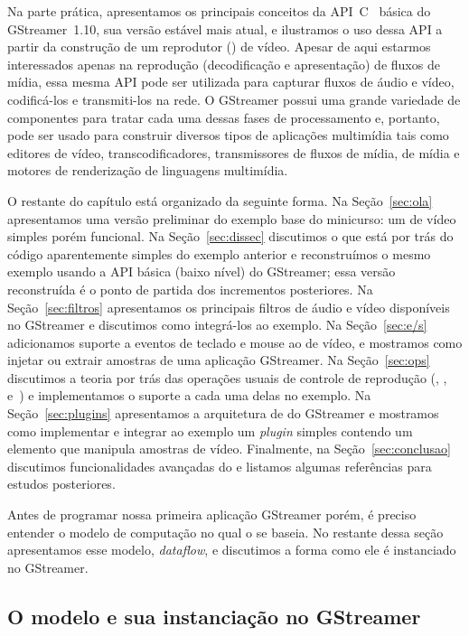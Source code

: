 \documentclass{SBCbookchapter}
\begin{document}
Na parte prática, apresentamos os principais conceitos da
API~C~\cite{Kernighan-B-W-1988} básica do GStreamer~1.10, sua versão estável
mais atual, e ilustramos o uso dessa API a partir da construção de um
reprodutor () de vídeo.  Apesar de aqui estarmos interessados
apenas na reprodução (decodificação e apresentação) de fluxos de mídia, essa
mesma API pode ser utilizada para capturar fluxos de áudio e vídeo,
codificá-los e transmiti-los na rede.  O GStreamer possui uma grande
variedade de componentes para tratar cada uma dessas fases de processamento
e, portanto, pode ser usado para construir diversos tipos de aplicações
multimídia tais como editores de vídeo, transcodificadores, transmissores de
fluxos de mídia,  de mídia e motores de renderização de
linguagens multimídia.

O restante do capítulo está organizado da seguinte forma.  Na
Seção~\ref{sec:ola} apresentamos uma versão preliminar do exemplo base do
minicurso: um  de vídeo simples porém funcional.  Na
Seção~\ref{sec:dissec} discutimos o que está por trás do código
aparentemente simples do exemplo anterior e reconstruímos o mesmo exemplo
usando a API básica (baixo nível) do GStreamer; essa versão reconstruída é o
ponto de partida dos incrementos posteriores.  Na Seção~\ref{sec:filtros}
apresentamos os principais filtros de áudio e vídeo disponíveis no GStreamer
e discutimos como integrá-los ao exemplo.  Na Seção~\ref{sec:e/s}
adicionamos suporte a eventos de teclado e mouse ao  de vídeo, e
mostramos como injetar ou extrair amostras de uma aplicação GStreamer.  Na
Seção~\ref{sec:ops} discutimos a teoria por trás das operações usuais de
controle de reprodução (, , 
e~) e implementamos o suporte a cada uma delas no exemplo.  Na
Seção~\ref{sec:plugins} apresentamos a arquitetura de  do
GStreamer e mostramos como implementar e integrar ao exemplo um
\emph{plugin} simples contendo um elemento que manipula amostras de vídeo.
Finalmente, na Seção~\ref{sec:conclusao} discutimos funcionalidades
avançadas do  e listamos algumas referências para estudos
posteriores.

Antes de programar nossa primeira aplicação GStreamer porém, é preciso
entender o modelo de computação no qual o  se baseia.  No
restante dessa seção apresentamos esse modelo, \emph{dataflow}, e discutimos
a forma como ele é instanciado no GStreamer.


\subsection*{O modelo  e sua instanciação no GStreamer}
\end{document}
